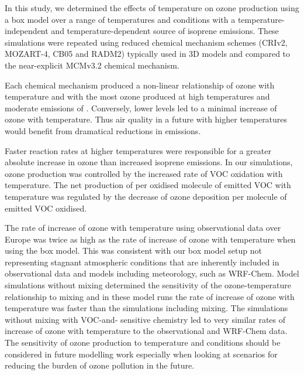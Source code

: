 In this study, we determined the effects of temperature on ozone production using a box model over a range of temperatures and  conditions with a temperature-independent and temperature-dependent source of isoprene emissions.
These simulations were repeated using reduced chemical mechanism schemes (CRIv2, MOZART-4, CB05 and RADM2) typically used in 3D models and compared to the near-explicit MCMv3.2 chemical mechanism.

Each chemical mechanism produced a non-linear relationship of ozone with temperature and  with the most ozone produced at high temperatures and moderate emissions of .
Conversely, lower  levels led to a minimal increase of ozone with temperature.
Thus air quality in a future with higher temperatures would benefit from dramatical reductions in  emissions.

Faster reaction rates at higher temperatures were responsible for a greater absolute increase in ozone than increased isoprene emissions.
In our simulations, ozone production was controlled by the increased rate of VOC oxidation with temperature.
The net production of  per oxidised molecule of emitted VOC with temperature was regulated by the decrease of ozone deposition per molecule of emitted VOC oxidised.

The rate of increase of ozone with temperature using observational data over Europe was twice as high as the rate of increase of ozone with temperature when using the box model.
This was consistent with our box model setup not representing stagnant atmospheric conditions that are inherently included in observational data and models including meteorology, such as WRF-Chem.
Model simulations without mixing determined the sensitivity of the ozone-temperature relationship to mixing and in these model runs the rate of increase of ozone with temperature was faster than the simulations including mixing.
The simulations without mixing with VOC-and- sensitive chemistry led to very similar rates of increase of ozone with temperature to the observational and WRF-Chem data.
The sensitivity of ozone production to temperature and  conditions should be considered in future modelling work especially when looking at scenarios for reducing the burden of ozone pollution in the future.
